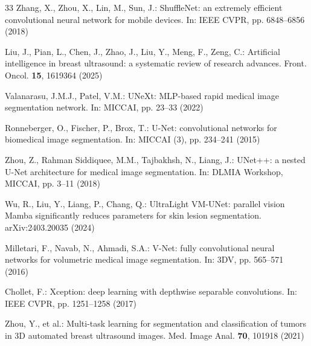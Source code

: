 \documentclass[runningheads]{llncs}
\begin{document}
\begin{thebibliography}{33}
Zhang, X., Zhou, X., Lin, M., Sun, J.: ShuffleNet: an extremely efficient convolutional neural network for mobile devices. In: IEEE CVPR, pp. 6848--6856 (2018)

Liu, J., Pian, L., Chen, J., Zhao, J., Liu, Y., Meng, F., Zeng, C.: Artificial intelligence in breast ultrasound: a systematic review of research advances. Front. Oncol. \textbf{15}, 1619364 (2025)

Valanarasu, J.M.J., Patel, V.M.: UNeXt: MLP-based rapid medical image segmentation network. In: MICCAI, pp. 23--33 (2022)

Ronneberger, O., Fischer, P., Brox, T.: U-Net: convolutional networks for biomedical image segmentation. In: MICCAI (3), pp. 234--241 (2015)

Zhou, Z., Rahman Siddiquee, M.M., Tajbakhsh, N., Liang, J.: UNet++: a nested U-Net architecture for medical image segmentation. In: DLMIA Workshop, MICCAI, pp. 3--11 (2018)

Wu, R., Liu, Y., Liang, P., Chang, Q.: UltraLight VM-UNet: parallel vision Mamba significantly reduces parameters for skin lesion segmentation. arXiv:2403.20035 (2024)

Milletari, F., Navab, N., Ahmadi, S.A.: V-Net: fully convolutional neural networks for volumetric medical image segmentation. In: 3DV, pp. 565--571 (2016)

Chollet, F.: Xception: deep learning with depthwise separable convolutions. In: IEEE CVPR, pp. 1251--1258 (2017)

Zhou, Y., et al.: Multi-task learning for segmentation and classification of tumors in 3D automated breast ultrasound images. Med. Image Anal. \textbf{70}, 101918 (2021)

\end{thebibliography}



\end{document}
